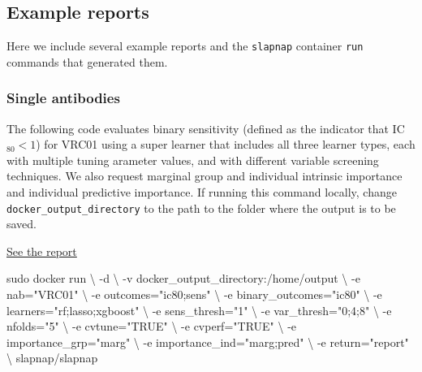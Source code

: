 \documentclass[]{article}
\newenvironment{Shaded}{\begin{snugshade}}{\end{snugshade}}
\newcommand{\StringTok}[1]{\textcolor[rgb]{0.31,0.60,0.02}{#1}}
\newcommand{\FunctionTok}[1]{\textcolor[rgb]{0.00,0.00,0.00}{#1}}
\newcommand{\NormalTok}[1]{#1}
\begin{document}
\subsection{Example reports}\label{example-reports}

Here we include several example reports and the \texttt{slapnap}
container \texttt{run} commands that generated them.

\subsubsection{Single antibodies}\label{single-antibodies}

The following code evaluates binary sensitivity (defined as the
indicator that IC\(_{80} < 1\)) for VRC01 using a super learner that
includes all three learner types, each with multiple tuning arameter
values, and with different variable screening techniques. We also
request marginal group and individual intrinsic importance and
individual predictive importance. If running this command locally,
change \texttt{docker\_output\_directory} to the path to the folder
where the output is to be saved.

\href{reports/report_VRC01.html}{See the report}

\begin{Shaded}
\begin{Highlighting}[]
\FunctionTok{sudo}\NormalTok{ docker run \textbackslash{}}
\NormalTok{    -d \textbackslash{}}
\NormalTok{    -v docker_output_directory:/home/output \textbackslash{}}
\NormalTok{    -e nab=}\StringTok{"VRC01"}\NormalTok{ \textbackslash{}}
\NormalTok{    -e outcomes=}\StringTok{"ic80;sens"}\NormalTok{ \textbackslash{}}
\NormalTok{    -e binary_outcomes=}\StringTok{"ic80"}\NormalTok{ \textbackslash{}}
\NormalTok{    -e learners=}\StringTok{"rf;lasso;xgboost"}\NormalTok{ \textbackslash{}}
\NormalTok{    -e sens_thresh=}\StringTok{"1"}\NormalTok{ \textbackslash{}}
\NormalTok{    -e var_thresh=}\StringTok{"0;4;8"}\NormalTok{ \textbackslash{}}
\NormalTok{    -e nfolds=}\StringTok{"5"}\NormalTok{ \textbackslash{}}
\NormalTok{    -e cvtune=}\StringTok{"TRUE"}\NormalTok{ \textbackslash{}}
\NormalTok{    -e cvperf=}\StringTok{"TRUE"}\NormalTok{ \textbackslash{}}
\NormalTok{    -e importance_grp=}\StringTok{"marg"}\NormalTok{ \textbackslash{}}
\NormalTok{    -e importance_ind=}\StringTok{"marg;pred"}\NormalTok{ \textbackslash{}}
\NormalTok{    -e return=}\StringTok{"report"}\NormalTok{ \textbackslash{}}
\NormalTok{    slapnap/slapnap}
\end{Highlighting}
\end{Shaded}
\end{document}
